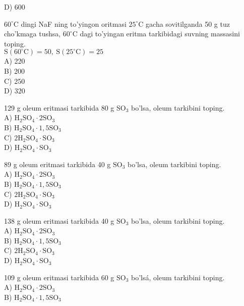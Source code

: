 D) 600
  \item $60^{\circ} \mathrm{C}$ dingi NaF ning to'yingon oritmasi $25^{\circ} \mathrm{C}$ gacha sovitilganda 50 g tuz cho'kmaga tushsa, $60^{\circ} \mathrm{C}$ dagi to'yingan eritma tarkibidagi suvning massasini toping.\\
$\mathrm{S}\left(60^{\circ} \mathrm{C}\right)=50, \mathrm{~S}\left(25^{\circ} \mathrm{C}\right)=25$\\
A) 220\\
B) 200\\
C) 250\\
D) 320
  \item 129 g oleum eritmasi tarkibida 80 g $\mathrm{SO}_{3}$ bo'lsa, oleum tarkibini toping.\\
A) $\mathrm{H}_{2} \mathrm{SO}_{4} \cdot 2 \mathrm{SO}_{3}$\\
B) $\mathrm{H}_{2} \mathrm{SO}_{4} \cdot 1,5 \mathrm{SO}_{3}$\\
C) $2 \mathrm{H}_{2} \mathrm{SO}_{4} \cdot \mathrm{SO}_{3}$\\
D) $\mathrm{H}_{2} \mathrm{SO}_{4} \cdot \mathrm{SO}_{3}$
  \item 89 g oleum eritmasi tarkibida 40 g $\mathrm{SO}_{3}$ bo'lsa, oleum tarkibini toping.\\
A) $\mathrm{H}_{2} \mathrm{SO}_{4} \cdot 2 \mathrm{SO}_{3}$\\
B) $\mathrm{H}_{2} \mathrm{SO}_{4} \cdot 1,5 \mathrm{SO}_{3}$\\
C) $2 \mathrm{H}_{2} \mathrm{SO}_{4} \cdot \mathrm{SO}_{3}$\\
D) $\mathrm{H}_{2} \mathrm{SO}_{4} \cdot \mathrm{SO}_{3}$
  \item 138 g oleum eritmasi tarkibida 40 g $\mathrm{SO}_{3}$ bo'lsa, oleum tarkibini toping.\\
A) $\mathrm{H}_{2} \mathrm{SO}_{4} \cdot 2 \mathrm{SO}_{3}$\\
B) $\mathrm{H}_{2} \mathrm{SO}_{4} \cdot 1,5 \mathrm{SO}_{3}$\\
C) $2 \mathrm{H}_{2} \mathrm{SO}_{4} \cdot \mathrm{SO}_{3}$\\
D) $\mathrm{H}_{2} \mathrm{SO}_{4} \cdot \mathrm{SO}_{3}$
  \item 109 g oleum eritmasi tarkibida 60 g $\mathrm{SO}_{3}$ bo'lsá, oleum tarkibini toping.\\
A) $\mathrm{H}_{2} \mathrm{SO}_{4} \cdot 2 \mathrm{SO}_{3}$\\
B) $\mathrm{H}_{2} \mathrm{SO}_{4} \cdot 1,5 \mathrm{SO}_{3}$\\
